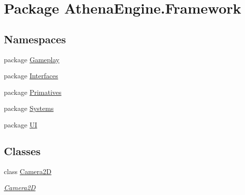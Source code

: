 \hypertarget{namespace_athena_engine_1_1_framework}{\section{Package Athena\-Engine.\-Framework}
\label{namespace_athena_engine_1_1_framework}
}
\subsection*{Namespaces}
\begin{DoxyCompactItemize}
\item 
package \hyperlink{namespace_athena_engine_1_1_framework_1_1_gameplay}{Gameplay}
\item 
package \hyperlink{namespace_athena_engine_1_1_framework_1_1_interfaces}{Interfaces}
\item 
package \hyperlink{namespace_athena_engine_1_1_framework_1_1_primatives}{Primatives}
\item 
package \hyperlink{namespace_athena_engine_1_1_framework_1_1_systems}{Systems}
\item 
package \hyperlink{namespace_athena_engine_1_1_framework_1_1_u_i}{U\-I}
\end{DoxyCompactItemize}
\subsection*{Classes}
\begin{DoxyCompactItemize}
\item 
class \hyperlink{class_athena_engine_1_1_framework_1_1_camera2_d}{Camera2\-D}
\begin{DoxyCompactList}\small\item\em \hyperlink{class_athena_engine_1_1_framework_1_1_camera2_d}{Camera2\-D} \end{DoxyCompactList}\end{DoxyCompactItemize}
